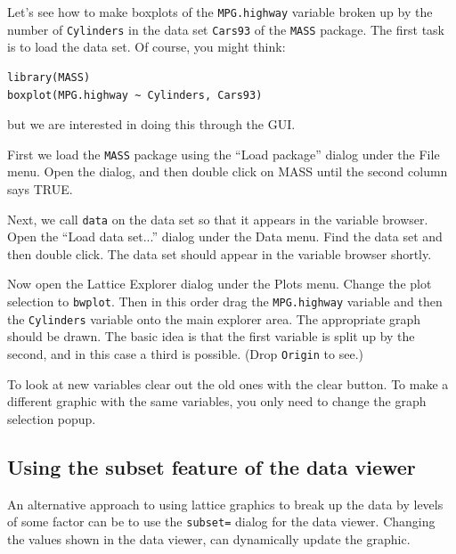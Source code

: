 \documentclass[12pt]{article}
\newcommand{\RCode}[1]{\texttt{#1}}
\begin{document}
Let's see how to make boxplots of the \RCode{MPG.highway} variable
broken up by the number of \RCode{Cylinders} in the data set
\RCode{Cars93} of the \RCode{MASS} package. The first task is to load
the data set. Of course, you might think:

\begin{verbatim}
library(MASS)
boxplot(MPG.highway ~ Cylinders, Cars93)
\end{verbatim}

but we are interested in doing this through the GUI.

First we load the \RCode{MASS} package using the ``Load package''
dialog under the File menu. Open the dialog, and then double click on
MASS until the second column says TRUE.

Next, we call \RCode{data} on the data set so that it appears in the
variable browser. Open the ``Load data set...'' dialog under the Data
menu. Find the data set and then double click. The data set should
appear in the variable browser shortly.

Now open the Lattice Explorer dialog under the Plots menu. Change the
plot selection to \RCode{bwplot}. Then in this order drag the
\RCode{MPG.highway} variable and then the \RCode{Cylinders} variable
onto the main explorer area. The appropriate graph should be
drawn. The basic idea is that the first variable is split up by the
second, and in this case a third is possible. (Drop \RCode{Origin} to
see.)

To look at new variables clear out the old ones with the clear
button. To make a different graphic with the same variables, you only
need to change the graph selection popup.


\subsection{Using the subset feature of the data viewer}

An alternative approach to using lattice graphics to break up the data
by levels of some factor can be to use the \RCode{subset=} dialog for
the data viewer. Changing the values shown in the data viewer, can
dynamically update the graphic. 
\end{document}
